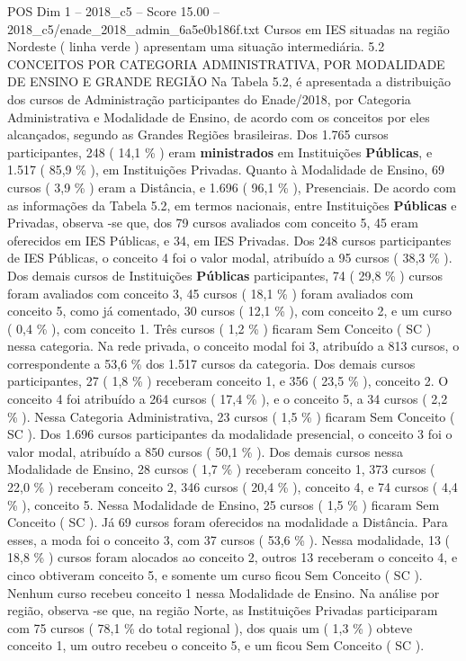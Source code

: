 \begin{textsample}{POS Dim 1 – 2018\_c5 – Score 15.00 – 2018\_c5/enade\_2018\_admin\_6a5e0b186f.txt}
Cursos em IES situadas na região Nordeste ( linha verde ) apresentam uma situação intermediária. 5.2 CONCEITOS POR CATEGORIA ADMINISTRATIVA, POR MODALIDADE DE ENSINO E GRANDE REGIÃO Na Tabela 5.2, é apresentada a distribuição dos cursos de Administração participantes do Enade/2018, por Categoria Administrativa e Modalidade de Ensino, de acordo com os conceitos por eles alcançados, segundo as Grandes Regiões brasileiras.
Dos 1.765 cursos participantes, 248 ( 14,1 \% ) eram \textbf{ministrados} em Instituições \textbf{Públicas}, e 1.517 ( 85,9 \% ), em Instituições Privadas.
Quanto à Modalidade de Ensino, 69 cursos ( 3,9 \% ) eram a Distância, e 1.696 ( 96,1 \% ), Presenciais.
De acordo com as informações da Tabela 5.2, em termos nacionais, entre Instituições \textbf{Públicas} e Privadas, observa -se que, dos 79 cursos avaliados com conceito 5, 45 eram oferecidos em IES Públicas, e 34, em IES Privadas.
Dos 248 cursos participantes de IES Públicas, o conceito 4 foi o valor modal, atribuído a 95 cursos ( 38,3 \% ).
Dos demais cursos de Instituições \textbf{Públicas} participantes, 74 ( 29,8 \% ) cursos foram avaliados com conceito 3, 45 cursos ( 18,1 \% ) foram avaliados com conceito 5, como já comentado, 30 cursos ( 12,1 \% ), com conceito 2, e um curso ( 0,4 \% ), com conceito 1.
Três cursos ( 1,2 \% ) ficaram Sem Conceito ( SC ) nessa categoria.
Na rede privada, o conceito modal foi 3, atribuído a 813 cursos, o correspondente a 53,6 \% dos 1.517 cursos da categoria.
Dos demais cursos participantes, 27 ( 1,8 \% ) receberam conceito 1, e 356 ( 23,5 \% ), conceito 2.
O conceito 4 foi atribuído a 264 cursos ( 17,4 \% ), e o conceito 5, a 34 cursos ( 2,2 \% ).
Nessa Categoria Administrativa, 23 cursos ( 1,5 \% ) ficaram Sem Conceito ( SC ).
Dos 1.696 cursos participantes da modalidade presencial, o conceito 3 foi o valor modal, atribuído a 850 cursos ( 50,1 \% ).
Dos demais cursos nessa Modalidade de Ensino, 28 cursos ( 1,7 \% ) receberam conceito 1, 373 cursos ( 22,0 \% ) receberam conceito 2, 346 cursos ( 20,4 \% ), conceito 4, e 74 cursos ( 4,4 \% ), conceito 5.
Nessa Modalidade de Ensino, 25 cursos ( 1,5 \% ) ficaram Sem Conceito ( SC ).
Já 69 cursos foram oferecidos na modalidade a Distância.
Para esses, a moda foi o conceito 3, com 37 cursos ( 53,6 \% ).
Nessa modalidade, 13 ( 18,8 \% ) cursos foram alocados ao conceito 2, outros 13 receberam o conceito 4, e cinco obtiveram conceito 5, e somente um curso ficou Sem Conceito ( SC ).
Nenhum curso recebeu conceito 1 nessa Modalidade de Ensino.
Na análise por região, observa -se que, na região Norte, as Instituições Privadas participaram com 75 cursos ( 78,1 \% do total regional ), dos quais um ( 1,3 \% ) obteve conceito 1, um outro recebeu o conceito 5, e um ficou Sem Conceito ( SC ).

\end{textsample}
